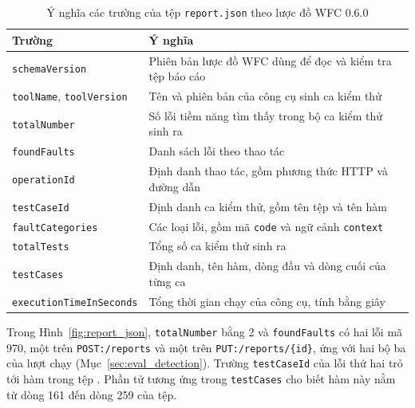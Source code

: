 \begin{table}[H]
  \centering
  \caption{Ý nghĩa các trường của tệp \texttt{report.json} theo lược đồ WFC 0.6.0}
  \label{tab:report_fields}
  \footnotesize
  \begin{tabularx}{\textwidth}{@{}l >{\raggedright\arraybackslash}X@{}}
    \toprule
    \textbf{Trường} & \textbf{Ý nghĩa} \\
    \midrule
    \texttt{schemaVersion} & Phiên bản lược đồ WFC dùng để đọc và kiểm tra tệp báo cáo \\
    \texttt{toolName}, \texttt{toolVersion} & Tên và phiên bản của công cụ sinh ca kiểm thử \\
    \texttt{totalNumber} & Số lỗi tiềm năng tìm thấy trong bộ ca kiểm thử sinh ra \\
    \texttt{foundFaults} & Danh sách lỗi theo thao tác \\
    \texttt{operationId} & Định danh thao tác, gồm phương thức HTTP và đường dẫn \\
    \texttt{testCaseId} & Định danh ca kiểm thử, gồm tên tệp và tên hàm \\
    \texttt{faultCategories} & Các loại lỗi, gồm mã \texttt{code} và ngữ cảnh \texttt{context} \\
    \texttt{totalTests} & Tổng số ca kiểm thử sinh ra \\
    \texttt{testCases} & Định danh, tên hàm, dòng đầu và dòng cuối của từng ca \\
    \texttt{executionTimeInSeconds} & Tổng thời gian chạy của công cụ, tính bằng giây \\
    \bottomrule
  \end{tabularx}
\end{table}

Trong Hình~\ref{fig:report_json}, \texttt{totalNumber} bằng 2 và \texttt{foundFaults} có hai lỗi mã 970, một trên \texttt{POST:/reports} và một trên \texttt{PUT:/reports/\{id\}}, ứng với hai bộ ba của lượt chạy (Mục~\ref{sec:eval_detection}). Trường \texttt{testCaseId} của lỗi thứ hai trỏ tới hàm  trong tệp . Phần tử tương ứng trong \texttt{testCases} cho biết hàm này nằm từ dòng 161 đến dòng 259 của tệp.

